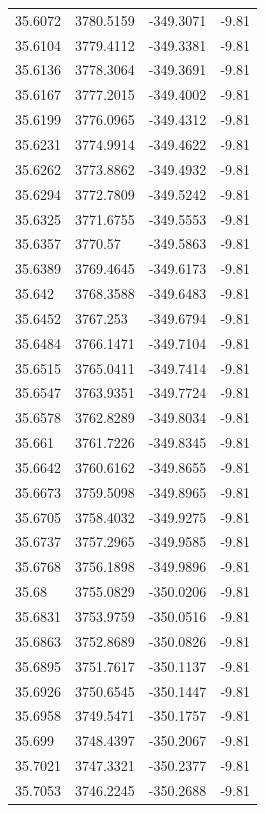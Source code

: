 \begin{table}[H]
\begin{tabular}{llll}
35.6072 & 3780.5159 & -349.3071 & -9.81 \\
35.6104 & 3779.4112 & -349.3381 & -9.81 \\
35.6136 & 3778.3064 & -349.3691 & -9.81 \\
35.6167 & 3777.2015 & -349.4002 & -9.81 \\
35.6199 & 3776.0965 & -349.4312 & -9.81 \\
35.6231 & 3774.9914 & -349.4622 & -9.81 \\
35.6262 & 3773.8862 & -349.4932 & -9.81 \\
35.6294 & 3772.7809 & -349.5242 & -9.81 \\
35.6325 & 3771.6755 & -349.5553 & -9.81 \\
35.6357 & 3770.57 & -349.5863 & -9.81 \\
35.6389 & 3769.4645 & -349.6173 & -9.81 \\
35.642 & 3768.3588 & -349.6483 & -9.81 \\
35.6452 & 3767.253 & -349.6794 & -9.81 \\
35.6484 & 3766.1471 & -349.7104 & -9.81 \\
35.6515 & 3765.0411 & -349.7414 & -9.81 \\
35.6547 & 3763.9351 & -349.7724 & -9.81 \\
35.6578 & 3762.8289 & -349.8034 & -9.81 \\
35.661 & 3761.7226 & -349.8345 & -9.81 \\
35.6642 & 3760.6162 & -349.8655 & -9.81 \\
35.6673 & 3759.5098 & -349.8965 & -9.81 \\
35.6705 & 3758.4032 & -349.9275 & -9.81 \\
35.6737 & 3757.2965 & -349.9585 & -9.81 \\
35.6768 & 3756.1898 & -349.9896 & -9.81 \\
35.68 & 3755.0829 & -350.0206 & -9.81 \\
35.6831 & 3753.9759 & -350.0516 & -9.81 \\
35.6863 & 3752.8689 & -350.0826 & -9.81 \\
35.6895 & 3751.7617 & -350.1137 & -9.81 \\
35.6926 & 3750.6545 & -350.1447 & -9.81 \\
35.6958 & 3749.5471 & -350.1757 & -9.81 \\
35.699 & 3748.4397 & -350.2067 & -9.81 \\
35.7021 & 3747.3321 & -350.2377 & -9.81 \\
35.7053 & 3746.2245 & -350.2688 & -9.81 \\

\end{tabular}
\end{table}
